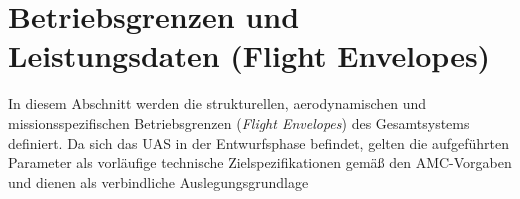 
\section{Betriebsgrenzen und Leistungsdaten (Flight Envelopes)}
\label{sec:flight_envelopes}

In diesem Abschnitt werden die strukturellen, aerodynamischen und missionsspezifischen Betriebsgrenzen (\textit{Flight Envelopes}) des Gesamtsystems definiert. 
Da sich das UAS in der Entwurfsphase befindet, gelten die aufgeführten Parameter als vorläufige technische Zielspezifikationen gemäß den AMC-Vorgaben \cite{easa_rules} und dienen als verbindliche Auslegungsgrundlage


